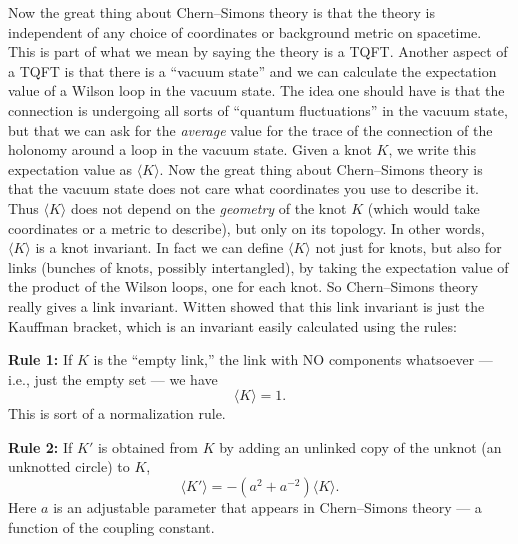 \documentclass[12pt]{article}
\begin{document}
Now the great thing about Chern--Simons theory is that the theory is
independent of any choice of coordinates or background metric on
spacetime. This is part of what we mean by saying the theory is a TQFT.
Another aspect of a TQFT is that there is a ``vacuum state'' and we can
calculate the expectation value of a Wilson loop in the vacuum state.
The idea one should have is that the connection is undergoing all sorts
of ``quantum fluctuations'' in the vacuum state, but that we can ask for
the \emph{average} value for the trace of the connection of the holonomy
around a loop in the vacuum state. Given a knot \(K\), we write this
expectation value as \(\langle K \rangle\). Now the great thing about
Chern--Simons theory is that the vacuum state does not care what
coordinates you use to describe it. Thus \(\langle K \rangle\) does not
depend on the \emph{geometry} of the knot \(K\) (which would take
coordinates or a metric to describe), but only on its topology. In other
words, \(\langle K \rangle\) is a knot invariant. In fact we can define
\(\langle K \rangle\) not just for knots, but also for links (bunches of
knots, possibly intertangled), by taking the expectation value of the
product of the Wilson loops, one for each knot. So Chern--Simons theory
really gives a link invariant. Witten showed that this link invariant is
just the Kauffman bracket, which is an invariant easily calculated using
the rules:

\textbf{Rule 1:} If \(K\) is the ``empty link,'' the link with NO
components whatsoever --- i.e., just the empty set --- we have
\[\langle K \rangle = 1.\] This is sort of a normalization rule.

\textbf{Rule 2:} If \(K'\) is obtained from \(K\) by adding an unlinked
copy of the unknot (an unknotted circle) to \(K\),
\[\langle K' \rangle = -(a^2 + a^{-2})\langle K \rangle.\] Here \(a\) is
an adjustable parameter that appears in Chern--Simons theory --- a
function of the coupling constant.
\end{document}
